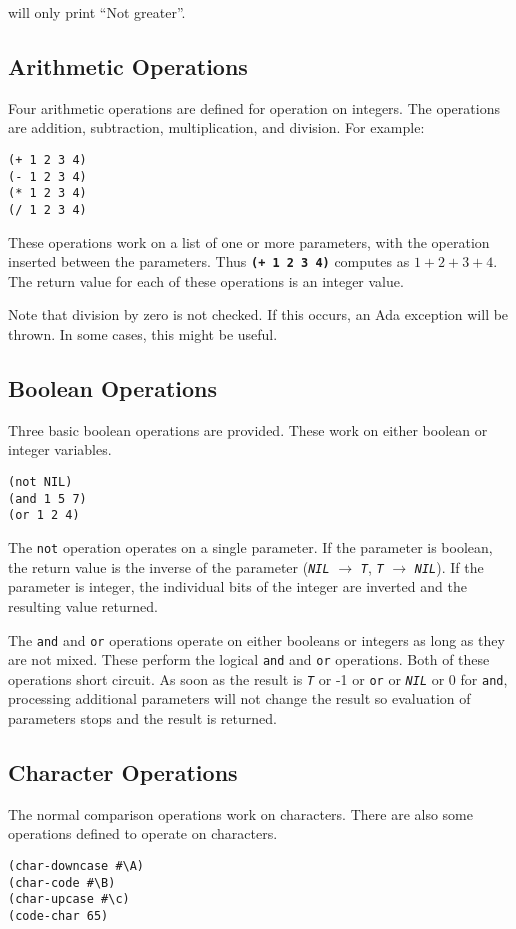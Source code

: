 \documentclass[10pt, openany]{book}
\newcommand{\operation}[1]{\textbf{\texttt{#1}}}
\newcommand{\function}[1]{\texttt{#1}}
\newcommand{\constant}[1]{\emph{\texttt{#1}}}
\begin{document}
will only print ``Not greater''.

\subsection{Arithmetic Operations}
Four arithmetic operations are defined for operation on integers.  The operations are addition, subtraction, multiplication, and division.  For example:
\begin{lstlisting}
(+ 1 2 3 4)
(- 1 2 3 4)
(* 1 2 3 4)
(/ 1 2 3 4)
\end{lstlisting}

These operations work on a list of one or more parameters, with the operation inserted between the parameters.  Thus \operation{(+ 1 2 3 4)} computes as $1+2+3+4$.  The return value for each of these operations is an integer value.

Note that division by zero is not checked.  If this occurs, an Ada exception will be thrown.  In some cases, this might be useful.

\subsection{Boolean Operations}
Three basic boolean operations are provided.  These work on either boolean or integer variables.
\begin{lstlisting}
(not NIL)
(and 1 5 7)
(or 1 2 4)
\end{lstlisting}

The \function{not} operation operates on a single parameter.  If the parameter is boolean, the return value is the inverse of the parameter (\constant{NIL} $\rightarrow$ \constant{T}, \constant{T} $\rightarrow$ \constant{NIL}).  If the parameter is integer, the individual bits of the integer are inverted and the resulting value returned.

The \function{and} and \function{or} operations operate on either booleans or integers as long as they are not mixed.  These perform the logical \function{and} and \function{or} operations.  Both of these operations short circuit.  As soon as the result is \constant{T} or -1 or \function{or} or \constant{NIL} or 0 for \function{and},  processing additional parameters will not change the result so evaluation of parameters stops and the result is returned.

\subsection{Character Operations}
The normal comparison operations work on characters.  There are also some operations defined to operate on characters.
\begin{lstlisting}
(char-downcase #\A)
(char-code #\B)
(char-upcase #\c)
(code-char 65)
\end{lstlisting}
\end{document}
